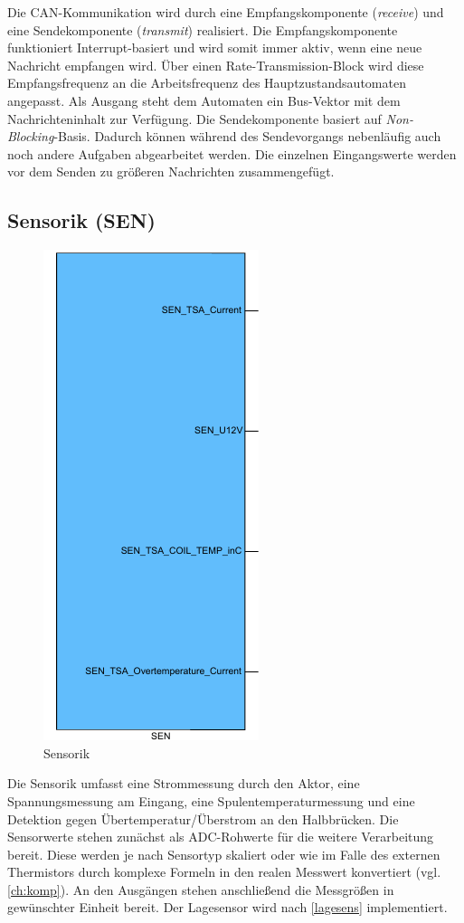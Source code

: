 Die CAN-Kommunikation wird durch eine Empfangskomponente (\textit{receive}) und eine Sendekomponente (\textit{transmit}) realisiert. Die Empfangskomponente funktioniert Interrupt-basiert und wird somit immer aktiv, wenn eine neue Nachricht empfangen wird. Über einen Rate-Transmission-Block wird diese Empfangsfrequenz an die Arbeitsfrequenz des Hauptzustandsautomaten angepasst. Als Ausgang steht dem Automaten ein Bus-Vektor mit dem Nachrichteninhalt zur Verfügung. 
Die Sendekomponente basiert auf \textit{Non-Blocking}-Basis. Dadurch können während des Sendevorgangs nebenläufig auch noch andere Aufgaben abgearbeitet werden. Die einzelnen Eingangswerte werden vor dem Senden zu größeren Nachrichten zusammengefügt.

\subsection{Sensorik (SEN)}\label{SEN}
\begin{figure}[H]%
\centering
\includegraphics[width=0.2\columnwidth]{./Bilder/fig_sen}%
\caption{Sensorik}%
\label{fig_sen}%
\end{figure}
Die Sensorik umfasst eine Strommessung durch den Aktor, eine Spannungsmessung am Eingang, eine Spulentemperaturmessung und eine Detektion gegen Übertemperatur/Überstrom an den Halbbrücken. Die Sensorwerte stehen zunächst als ADC-Rohwerte für die weitere Verarbeitung bereit. Diese werden je nach Sensortyp skaliert oder wie im Falle des externen Thermistors durch komplexe Formeln in den realen Messwert konvertiert (vgl. \autoref{ch:komp}). An den Ausgängen stehen anschließend die Messgrößen in gewünschter Einheit bereit. Der Lagesensor wird nach \autoref{lagesens} implementiert.

